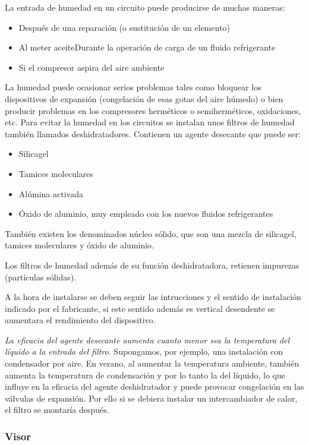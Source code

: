 La entrada de humedad en un circuito puede producirse de muchas maneras:

\begin{itemize}
	\item Después de una reparación (o sustitución de un elemento)
	\item Al meter aceiteDurante la operación de carga de un fluido refrigerante
	\item Si el compresor aspira del aire ambiente
\end{itemize}

La humedad puede ocasionar serios problemas tales como bloquear los dispositivos de expansión (congelación de esas gotas del aire húmedo) o bien producir problemas en los compresores herméticos o semiherméticos, oxidaciones, etc. Para evitar la humedad en los circuitos se instalan unos filtros de humedad también llamados deshidratadores. Contienen un agente desecante que puede ser:

\begin{itemize}
	\item Silicagel
	\item Tamices moleculares
	\item Alúmina activada 
	\item Óxido de aluminio, muy empleado con los nuevos fluidos refrigerantes
\end{itemize}

También existen los denominados núcleo sólido, que son una mezcla de silicagel, tamices moleculares y óxido de aluminio.

Los filtros de humedad además de su función deshidratadora, retienen impurezas (partículas sólidas). 

A la hora de instalarse se deben seguir las intrucciones y el sentido de instalación indicado por el fabricante, si este sentido además es vertical desendente se aumentara el rendimiento del dispositivo.

\textit{La eficacia del agente desecante aumenta cuanto menor sea la temperatura del líquido a la entrada del filtro.} Supongamos, por ejemplo, una instalación con condensador por aire. En verano, al aumentar la temperatura ambiente, también aumenta la temperatura de condensación y por lo tanto la del líquido, lo que influye en la eficacia del agente deshidratador y puede provocar congelación en las válvulas de expansión. Por ello si se debiera instalar un intercambiador de calor, el filtro se montaría después.

\subsubsection{Visor}

